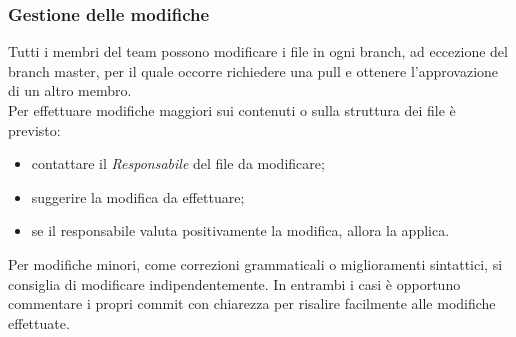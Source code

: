 \subsubsection{Gestione delle modifiche}
Tutti i membri del team possono modificare i file in ogni branch, ad eccezione del branch master, per il quale occorre richiedere una pull e ottenere l'approvazione di un altro membro. \\
Per effettuare modifiche maggiori sui contenuti o sulla struttura dei file è previsto: \begin{itemize}
\item contattare il \textit{Responsabile} del file da modificare;
\item suggerire la modifica da effettuare;
\item se il responsabile valuta positivamente la modifica, allora la applica.
\end{itemize}
Per modifiche minori, come correzioni grammaticali o miglioramenti sintattici, si consiglia di modificare indipendentemente. In entrambi i casi è opportuno commentare i propri commit con chiarezza per risalire facilmente alle modifiche effettuate.

